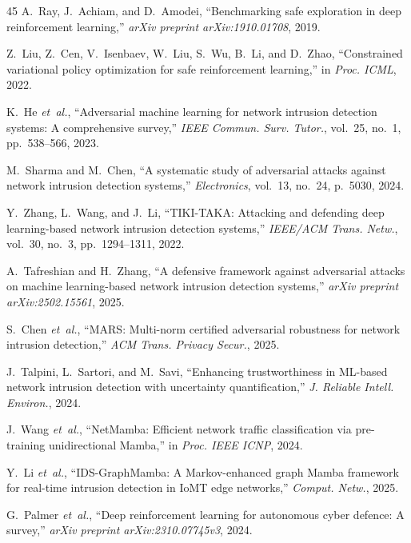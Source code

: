 \documentclass[journal]{IEEEtran}
\theoremstyle{definition}
\theoremstyle{remark}
\begin{document}
\begin{thebibliography}{45}
A.~Ray, J.~Achiam, and D.~Amodei,
``Benchmarking safe exploration in deep reinforcement learning,''
\emph{arXiv preprint arXiv:1910.01708}, 2019.

Z.~Liu, Z.~Cen, V.~Isenbaev, W.~Liu, S.~Wu, B.~Li, and D.~Zhao,
``Constrained variational policy optimization for safe reinforcement learning,''
in \emph{Proc. ICML}, 2022.

K.~He \textit{et~al.},
``Adversarial machine learning for network intrusion detection systems: A comprehensive survey,''
\emph{IEEE Commun. Surv. Tutor.}, vol.~25, no.~1, pp.~538--566, 2023.

M.~Sharma and M.~Chen,
``A systematic study of adversarial attacks against network intrusion detection systems,''
\emph{Electronics}, vol.~13, no.~24, p.~5030, 2024.

Y.~Zhang, L.~Wang, and J.~Li,
``{TIKI-TAKA}: Attacking and defending deep learning-based network intrusion detection systems,''
\emph{IEEE/ACM Trans. Netw.}, vol.~30, no.~3, pp.~1294--1311, 2022.

A.~Tafreshian and H.~Zhang,
``A defensive framework against adversarial attacks on machine learning-based network intrusion detection systems,''
\emph{arXiv preprint arXiv:2502.15561}, 2025.

S.~Chen \textit{et~al.},
``{MARS}: Multi-norm certified adversarial robustness for network intrusion detection,''
\emph{ACM Trans. Privacy Secur.}, 2025.

J.~Talpini, L.~Sartori, and M.~Savi,
``Enhancing trustworthiness in {ML}-based network intrusion detection with uncertainty quantification,''
\emph{J. Reliable Intell. Environ.}, 2024.

J.~Wang \textit{et~al.},
``{NetMamba}: Efficient network traffic classification via pre-training unidirectional {Mamba},''
in \emph{Proc. IEEE ICNP}, 2024.

Y.~Li \textit{et~al.},
``{IDS-GraphMamba}: A {M}arkov-enhanced graph {Mamba} framework for real-time intrusion detection in {IoMT} edge networks,''
\emph{Comput. Netw.}, 2025.

G.~Palmer \textit{et~al.},
``Deep reinforcement learning for autonomous cyber defence: A survey,''
\emph{arXiv preprint arXiv:2310.07745v3}, 2024.


\end{thebibliography}
\end{document}
